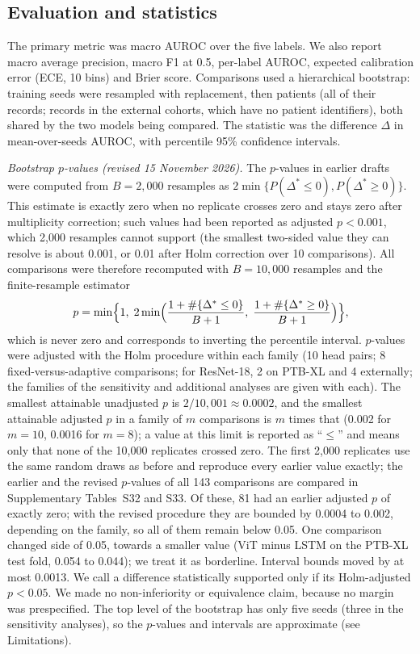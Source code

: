 \documentclass{wlscirep}
\begin{document}
\subsection*{Evaluation and statistics}
The primary metric was macro AUROC over the five labels. We also report macro average precision, macro F1 at 0.5, per-label AUROC, expected calibration error (ECE, 10 bins) \cite{guo2017calibration} and Brier score. Comparisons used a hierarchical bootstrap: training seeds were resampled with replacement, then patients (all of their records; records in the external cohorts, which have no patient identifiers), both shared by the two models being compared. The statistic was the difference $\Delta$ in mean-over-seeds AUROC, with percentile 95\% confidence intervals.

\emph{Bootstrap $p$-values (revised 15 November 2026).} The $p$-values in earlier drafts were computed from $B=2{,}000$ resamples as $2\min\{P(\Delta^*\le0),P(\Delta^*\ge0)\}$. This estimate is exactly zero when no replicate crosses zero and stays zero after multiplicity correction; such values had been reported as adjusted $p<0.001$, which 2{,}000 resamples cannot support (the smallest two-sided value they can resolve is about 0.001, or 0.01 after Holm correction over 10 comparisons). All comparisons were therefore recomputed with $B=10{,}000$ resamples and the finite-resample estimator
\[
p=\min\Bigl\{1,\;2\min\Bigl(\frac{1+\#\{\Delta^*\le0\}}{B+1},\;\frac{1+\#\{\Delta^*\ge0\}}{B+1}\Bigr)\Bigr\},
\]
which is never zero \cite{davison1997bootstrap,phipson2010permutation} and corresponds to inverting the percentile interval. $p$-values were adjusted with the Holm procedure \cite{holm1979simple} within each family (10 head pairs; 8 fixed-versus-adaptive comparisons; for ResNet-18, 2 on PTB-XL and 4 externally; the families of the sensitivity and additional analyses are given with each). The smallest attainable unadjusted $p$ is $2/10{,}001\approx0.0002$, and the smallest attainable adjusted $p$ in a family of $m$ comparisons is $m$ times that (0.002 for $m=10$, 0.0016 for $m=8$); a value at this limit is reported as ``$\le$'' and means only that none of the 10{,}000 replicates crossed zero. The first 2{,}000 replicates use the same random draws as before and reproduce every earlier value exactly; the earlier and the revised $p$-values of all 143 comparisons are compared in Supplementary Tables~S32 and S33. Of these, 81 had an earlier adjusted $p$ of exactly zero; with the revised procedure they are bounded by 0.0004 to 0.002, depending on the family, so all of them remain below 0.05. One comparison changed side of 0.05, towards a smaller value (ViT minus LSTM on the PTB-XL test fold, 0.054 to 0.044); we treat it as borderline. Interval bounds moved by at most 0.0013. We call a difference statistically supported only if its Holm-adjusted $p<0.05$. We made no non-inferiority or equivalence claim, because no margin was prespecified. The top level of the bootstrap has only five seeds (three in the sensitivity analyses), so the $p$-values and intervals are approximate (see Limitations).
\end{document}
